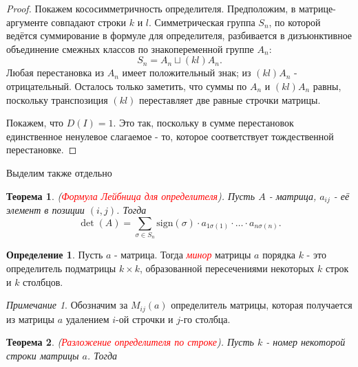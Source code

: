 \documentclass[a4paper,100pt]{article}
\theoremstyle{indented}
\newtheorem{theorem}{Теорема}
\theoremstyle{definition}
\newtheorem{defn}{Определение}
\theoremstyle{remark}
\newtheorem{remark}{Примечание}
\begin{document}
\begin{proof}
    Покажем кососимметричность определителя. Предположим, в матрице-аргументе совпадают строки $k$ и $l$. Симметрическая группа $S_n$, по которой ведётся суммирование в формуле для определителя, разбивается в дизъюнктивное объединение смежных классов по знакопеременной группе $A_n$:
    \[
        S_n=A_n\sqcup (kl)A_n.
    \]
    Любая перестановка из $A_n$ имеет положительный знак; из $(kl)A_n$ - отрицательный. Осталось только заметить, что суммы по $A_n$ и $(kl)A_n$ равны, поскольку транспозиция $(kl)$ переставляет две равные строчки матрицы.\ 

    Покажем, что $D(I)=1$. Это так, поскольку в сумме перестановок единственное ненулевое слагаемое - то, которое соответствует тождественной перестановке.

\end{proof}

Выделим также отдельно\\

\begin{theorem}
    (\hypertarget{n98}{\textcolor{red}{\textit{Формула Лейбница для определителя}}}). Пусть $A$ - матрица, $a_{ij}$ - её элемент в позиции $(i, j)$. Тогда 
    \[
        \det (A)=\sum_{\sigma\in S_n} \text{sign}(\sigma)\cdot a_{1\sigma(1)}\cdot \dots\cdot a_{n\sigma(n)}.
    \]
\end{theorem}

\begin{defn}
    Пусть $a$ - матрица. Тогда \hypertarget{n99}{\textcolor{red}{\textit{минор}}} матрицы $a$ порядка $k$ -  это определитель подматрицы $k\times k$, образованной пересечениями некоторых $k$ строк и $k$ столбцов.
\end{defn}

\begin{remark}
    Обозначим за $M_{ij}(a)$ определитель матрицы, которая получается из матрицы $a$ удалением $i$-ой строчки и $j$-го столбца.
\end{remark}

\begin{theorem}
    (\hypertarget{n100}{\textcolor{red}{\textit{Разложение определителя по строке}}}). Пусть $k$ - номер некоторой строки матрицы $a$. Тогда
\end{theorem}
\end{document}
